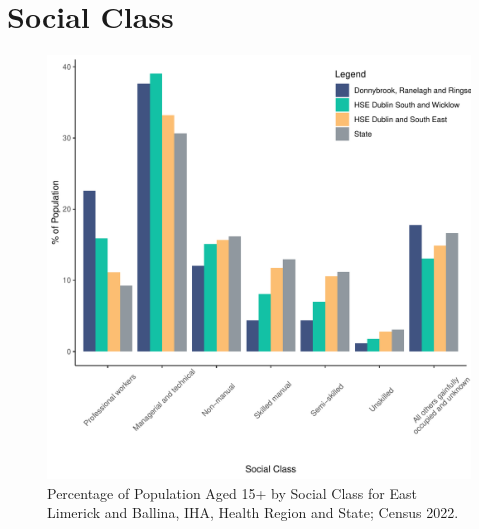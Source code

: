 \documentclass{article}
\begin{document}
\section{Social Class}\label{sect:SC}
\begin{figure}[H]
	\centering
	\includegraphics[width = 140mm]{../figures/SocialClassED.pdf}
	\caption{Percentage of Population Aged 15+ by Social Class for East Limerick and Ballina, IHA, Health Region and State; Census 2022.}
	\label{fig:vbnv}
	\end{figure}
\end{document}

